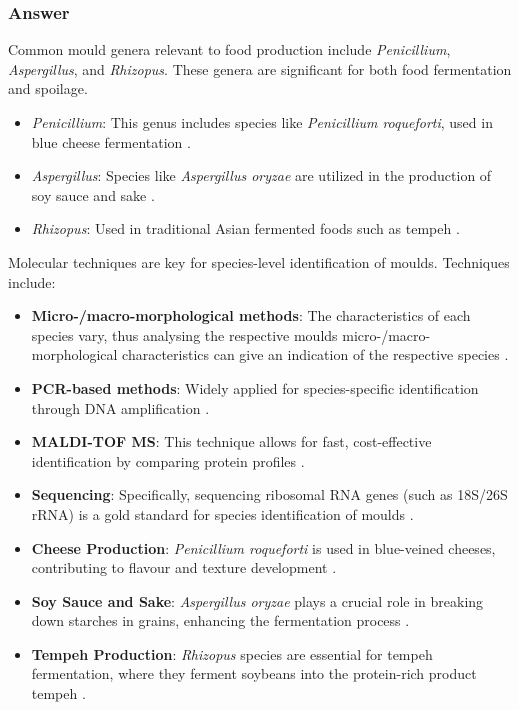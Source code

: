\subsubsection*{Answer}
Common mould genera relevant to food production include \textit{Penicillium}, \textit{Aspergillus}, and \textit{Rhizopus}. These genera are significant for both food fermentation and spoilage.
\begin{itemize}
    \item \textit{Penicillium}: This genus includes species like \textit{Penicillium roqueforti}, used in blue cheese fermentation \cite*{L8-MicroInFood}.
    \item \textit{Aspergillus}: Species like \textit{Aspergillus oryzae} are utilized in the production of soy sauce and sake \cite*{L1-DiversityMicro}.
    \item \textit{Rhizopus}: Used in traditional Asian fermented foods such as tempeh \cite*{L1-DiversityMicro,LS03}.
\end{itemize}

Molecular techniques are key for species-level identification of moulds. Techniques include:
\begin{itemize}
    \item \textbf{Micro-/macro-morphological methods}: The characteristics of each species vary, thus analysing the respective moulds micro-/macro-morphological characteristics can give an indication of the respective species \cite*{LabManual}.
    \item \textbf{PCR-based methods}: Widely applied for species-specific identification through DNA amplification \cite*{L1-DiversityMicro}.
    \item \textbf{MALDI-TOF MS}: This technique allows for fast, cost-effective identification by comparing protein profiles \cite*{L9-Coryn}.
    \item \textbf{Sequencing}: Specifically, sequencing ribosomal RNA genes (such as 18S/26S rRNA) is a gold standard for species identification of moulds \cite*{L3-SeqBasedClass}.
\end{itemize}

\begin{itemize}
    \item \textbf{Cheese Production}: \textit{Penicillium roqueforti} is used in blue-veined cheeses, contributing to flavour and texture development \cite*{L8-MicroInFood}.
    \item \textbf{Soy Sauce and Sake}: \textit{Aspergillus oryzae} plays a crucial role in breaking down starches in grains, enhancing the fermentation process \cite*{L1-DiversityMicro}.
    \item \textbf{Tempeh Production}: \textit{Rhizopus} species are essential for tempeh fermentation, where they ferment soybeans into the protein-rich product tempeh \cite*{L1-DiversityMicro}.
\end{itemize}

